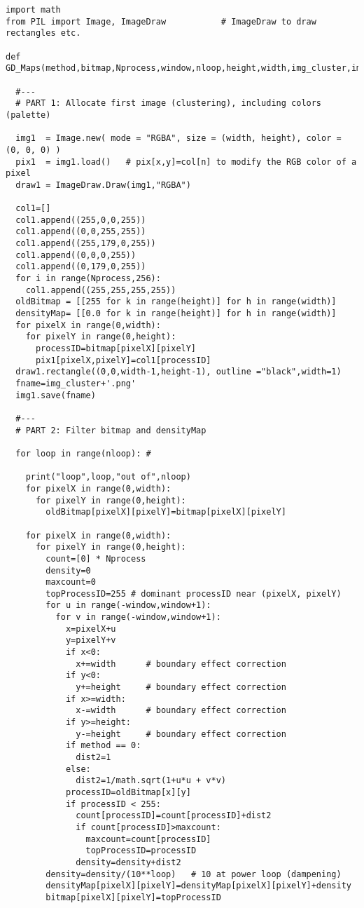 \documentclass[oneside,10pt]{book}
\begin{document}
\begin{lstlisting}
import math
from PIL import Image, ImageDraw           # ImageDraw to draw rectangles etc.

def GD_Maps(method,bitmap,Nprocess,window,nloop,height,width,img_cluster,img_density):

  #---
  # PART 1: Allocate first image (clustering), including colors (palette)

  img1  = Image.new( mode = "RGBA", size = (width, height), color = (0, 0, 0) )
  pix1  = img1.load()   # pix[x,y]=col[n] to modify the RGB color of a pixel
  draw1 = ImageDraw.Draw(img1,"RGBA")

  col1=[] 
  col1.append((255,0,0,255))
  col1.append((0,0,255,255))
  col1.append((255,179,0,255))
  col1.append((0,0,0,255))
  col1.append((0,179,0,255))
  for i in range(Nprocess,256):
    col1.append((255,255,255,255))
  oldBitmap = [[255 for k in range(height)] for h in range(width)]
  densityMap= [[0.0 for k in range(height)] for h in range(width)]
  for pixelX in range(0,width): 
    for pixelY in range(0,height): 
      processID=bitmap[pixelX][pixelY]
      pix1[pixelX,pixelY]=col1[processID] 
  draw1.rectangle((0,0,width-1,height-1), outline ="black",width=1)
  fname=img_cluster+'.png'
  img1.save(fname)

  #---
  # PART 2: Filter bitmap and densityMap 

  for loop in range(nloop): #  

    print("loop",loop,"out of",nloop)
    for pixelX in range(0,width): 
      for pixelY in range(0,height): 
        oldBitmap[pixelX][pixelY]=bitmap[pixelX][pixelY]

    for pixelX in range(0,width): 
      for pixelY in range(0,height):   
        count=[0] * Nprocess
        density=0
        maxcount=0
        topProcessID=255 # dominant processID near (pixelX, pixelY)
        for u in range(-window,window+1): 
          for v in range(-window,window+1):
            x=pixelX+u
            y=pixelY+v
            if x<0: 
              x+=width      # boundary effect correction
            if y<0: 
              y+=height     # boundary effect correction
            if x>=width: 
              x-=width      # boundary effect correction
            if y>=height: 
              y-=height     # boundary effect correction
            if method == 0:
              dist2=1
            else: 
              dist2=1/math.sqrt(1+u*u + v*v)
            processID=oldBitmap[x][y]
            if processID < 255: 
              count[processID]=count[processID]+dist2
              if count[processID]>maxcount: 
                maxcount=count[processID]
                topProcessID=processID
              density=density+dist2 
        density=density/(10**loop)   # 10 at power loop (dampening)
        densityMap[pixelX][pixelY]=densityMap[pixelX][pixelY]+density
        bitmap[pixelX][pixelY]=topProcessID


\end{lstlisting}
\end{document}
